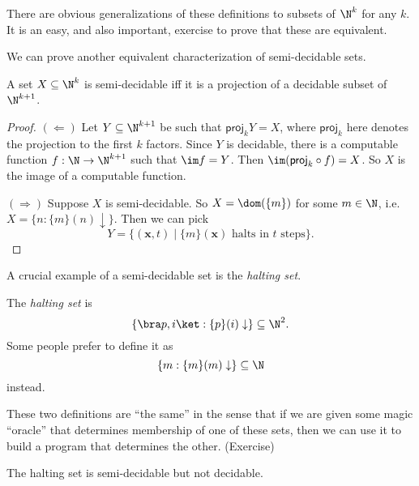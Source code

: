 \documentclass[a4paper]{article}
\newcommand\proj{\mathsf{proj}}
\begin{document}
There are obvious generalizations of these definitions to subsets of $\N^k$ for any $k$. It is an easy, and also important, exercise to prove that these are equivalent.

We can prove another equivalent characterization of semi-decidable sets.
\begin{prop}
  A set $X \subseteq \N^k$ is semi-decidable iff it is a projection of a decidable subset of $\N^{k + 1}$.
\end{prop}

\begin{proof}
  $(\Leftarrow)$ Let $Y \subseteq \N^{k + 1}$ be such that $\proj_k Y = X$, where $\proj_k$ here denotes the projection to the first $k$ factors. Since $Y$ is decidable, there is a computable function $f: \N \to \N^{k + 1}$ such that $\im f = Y$. Then $\im (\proj_k \circ f) = X$. So $X$ is the image of a computable function.

  $(\Rightarrow)$ Suppose $X$ is semi-decidable. So $X = \dom(\{m\})$ for some $m \in \N$, i.e.\ $X = \{n: \{m\}(n) \downarrow\}$. Then we can pick
  \[
    Y = \{(\mathbf{x}, t) \mid \{m\}(\mathbf{x})\text{ halts in $t$ steps}\}.
  \]
\end{proof}

A crucial example of a semi-decidable set is the \emph{halting set}.
\begin{defi}
  The \emph{halting set} is
  \[
    \{\bra p, i\ket : \{p\}(i) \downarrow \} \subseteq \N^2.
  \]
  Some people prefer to define it as
  \[
    \{m: \{m\}(m) \downarrow\} \subseteq \N
  \]
  instead.
\end{defi}
These two definitions are ``the same'' in the sense that if we are given some magic ``oracle'' that determines membership of one of these sets, then we can use it to build a program that determines the other. (Exercise)

\begin{thm}[Turing]
  The halting set is semi-decidable but not decidable.
\end{thm}
\end{document}
